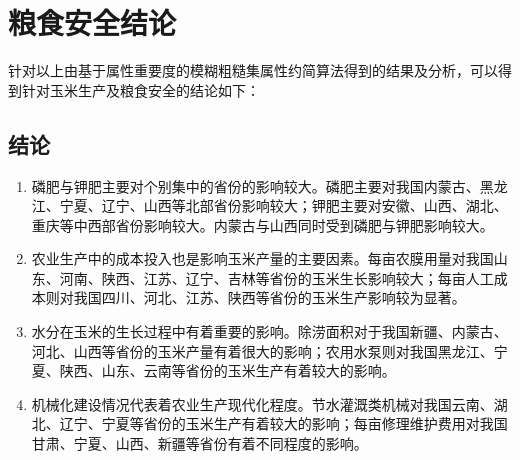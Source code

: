





\section{粮食安全结论}
针对以上由基于属性重要度的模糊粗糙集属性约简算法得到的结果及分析，可以得到针对玉米生产及粮食安全的结论如下：
\subsection{结论}
\begin{enumerate}
  \item 磷肥与钾肥主要对个别集中的省份的影响较大。磷肥主要对我国内蒙古、黑龙江、宁夏、辽宁、山西等北部省份影响较大；钾肥主要对安徽、山西、湖北、重庆等中西部省份影响较大。内蒙古与山西同时受到磷肥与钾肥影响较大。
  \item 农业生产中的成本投入也是影响玉米产量的主要因素。每亩农膜用量对我国山东、河南、陕西、江苏、辽宁、吉林等省份的玉米生长影响较大；每亩人工成本则对我国四川、河北、江苏、陕西等省份的玉米生产影响较为显著。
  \item 水分在玉米的生长过程中有着重要的影响。除涝面积对于我国新疆、内蒙古、河北、山西等省份的玉米产量有着很大的影响；农用水泵则对我国黑龙江、宁夏、陕西、山东、云南等省份的玉米生产有着较大的影响。
  \item 机械化建设情况代表着农业生产现代化程度。节水灌溉类机械对我国云南、湖北、辽宁、宁夏等省份的玉米生产有着较大的影响；每亩修理维护费用对我国甘肃、宁夏、山西、新疆等省份有着不同程度的影响。
\end{enumerate}

